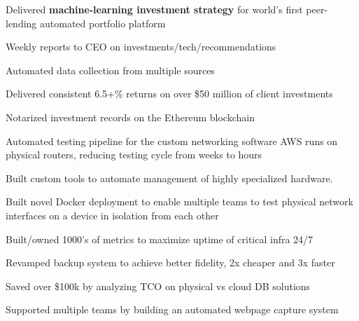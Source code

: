 \documentclass[]{resume}
\begin{document}
\begin{minipage}[t]{1.0\textwidth}
\begin{tightemize}
\item Delivered \textbf{machine-learning investment strategy} for world's first peer-lending automated portfolio platform
\item Weekly reports to CEO on investments/tech/recommendations
\item Automated data collection from multiple sources
\item Delivered consistent  6.5+\% returns on over \$50 million of client investments
\item Notarized investment records on the Ethereum blockchain
\end{tightemize}

\begin{tightemize}
\item Automated testing pipeline for the custom networking software AWS runs on physical routers, reducing testing cycle from weeks to hours
\item Built custom tools to automate management of highly specialized hardware.

\columnbreak

\item Built novel Docker deployment to enable multiple teams to test physical network interfaces on a device in isolation from each other
\end{tightemize}
\sectionsep
\end{minipage}

\begin{tightemize}
\item Built/owned 1000's of metrics to maximize uptime of critical infra 24/7
\item Revamped backup system to achieve better fidelity, 2x cheaper and 3x faster
\item Saved over \$100k by analyzing TCO on physical vs cloud DB solutions
\item Supported multiple teams by building an automated webpage capture system
\end{tightemize}
\end{document}
